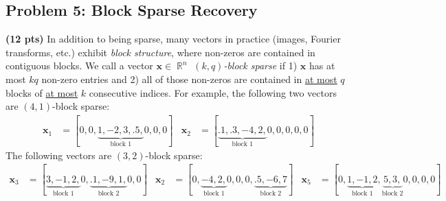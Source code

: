 \documentclass[10pt]{article}
\newcommand{\bv}[1]{\mathbf{#1}}
\DeclareMathOperator{\R}{\mathbb{R}}
\begin{document}
\subsection{Problem 5: Block Sparse Recovery}
\textbf{(12 pts)} In addition to being sparse, many vectors in practice (images, Fourier transforms, etc.) exhibit \emph{block structure}, where non-zeros are contained in contiguous blocks. We call a vector $\bv{x}\in \R^n$ \emph{$(k,q)$-block sparse} if 1) $\bv{x}$ has at most $kq$ non-zero entries and 2) all of those non-zeros are contained in \ul{at most} $q$ blocks of \ul{at most} $k$ consecutive indices. For example, the following two vectors are $(4,1)$-block sparse:
\begin{align*}
	\bv{x}_1 &= [0,0,\underbrace{1,-2,3,.5,}_{\text{block } 1}0,0,0] & \bv{x}_2 &= [\underbrace{.1,.3,-4,2,}_{\text{block } 1}0,0,0,0,0] 
\end{align*}
The following vectors are $(3,2)$-block sparse:
\begin{align*}
	\bv{x}_3 &= [\underbrace{3,-1,2,}_{\text{block } 1}0,\underbrace{.1,-9,1,}_{\text{block } 2}0,0] & \bv{x}_2 &= [0,\underbrace{-4,2,}_{\text{block } 1}0,0,0,\underbrace{.5,-6,7}_{\text{block } 2}] & \bv{x}_5 &= [0,\underbrace{1,-1,2}_{\text{block } 1},\underbrace{5,3,}_{\text{block } 2}0,0,0,0] 
\end{align*}
\end{document}
